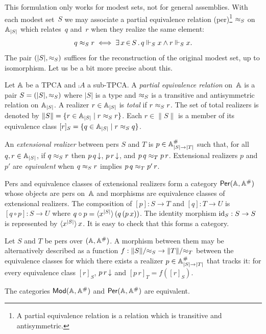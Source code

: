This formulation only works for modest sets, not for general
assemblies. With each modest set~$S$ we may associate a partial
equivalence relation (per)\footnote{A partial equivalence relation is
  a relation which is transitive and antisymmetric.} $\per_S$ on
$\xAtyp{S}$ which relates~$q$ and~$r$ when they realize the same
element:
%
\begin{equation*}
  q \per_S r \iff
  \xsome{x}{S}{q \rz_S x \land r \rz_S x}.
\end{equation*}
%
The pair $(|S|, {\per_S})$ suffices for the reconstruction of the
original modest set, up to isomorphism. Let us be a bit more precise
about this.

Let $\AA$ be a TPCA and $\comp{A}$ a sub-TPCA. A \emph{partial
  equivalence relation} on~$\AA$ is a pair $S = (|S|, {\per_S})$ where
$|S|$ is a type and $\per_S$ is a transitive and antisymmetric
relation on $\xAtyp{S}$. A realizer $r \in \xAtyp{S}$ is \emph{total} if
$r \per_S r$. The set of total realizers is denoted by $\|S\| = \set{r
  \in \xAtyp{S} \such r \per_S r}$. Each $r \in \|S\|$ is a member of
its equivalence class $[r]_S = \set{q \in \xAtyp{S} \such r \per_S q}$.

An \emph{extensional realizer} between pers $S$ and $T$ is $p \in
\compAtyp{|S| \to |T|}$ such that, for all $q, r \in \xAtyp{S}$, if $q
\per_S r$ then $\defined{p\,q}$, $\defined{p\,r}$, and $p\,q \per_T
p\,r$. Extensional realizers $p$ and $p'$ are \emph{equivalent} when
$q \per_S r$ implies $p\,q \per_T p'\,r$.

Pers and equivalence classes of extensional realizers form a category
$\Per{\AA, \compAA}$ whose objects are pers on~$\AA$ and morphisms are
equivalence classes of extensional realizers. The composition of $[p]
: S \to T$ and $[q] : T \to U$ is $[q \circ p] : S \to U$ where $q
\circ p = \pcalam{\annot{x}{|S|}}{q\,(p\,x)}$. The identity morphism
$\id_S : S \to S$ is represented by $\xpcalam{\annot{x}{|S|}}{x}$. It
is easy to check that this forms a category.

Let $S$ and $T$ be pers over $(\AA, \compAA)$. A morphism between them
may be alternatively described as a function $f : \|S\|/{\per_S} \to
\|T\|/{\per_T}$ between the equivalence classes for which there exists
a realizer $p \in \compAtyp{|S| \to |T|}$ that tracks it: for every
equivalence class $[r]_S$, $\defined{p\,r}$ and $[p\,r]_T = f([r]_S)$.

\begin{proposition}
  The categories $\Mod{\AA, \compAA}$ and $\Per{\AA, \compAA}$ are
  equivalent.
\end{proposition}

